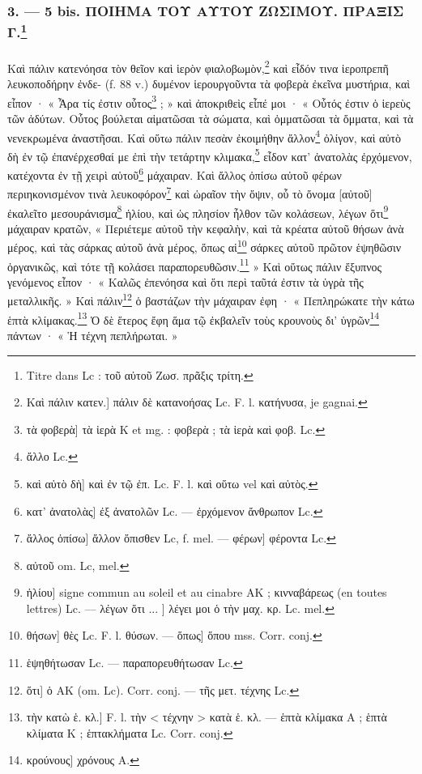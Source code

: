\documentclass[landscape, a4paper, 11pt, oneside, polutonikogreek, french]{article}
\begin{document}
\subsubsection[3. --- 5 bis. ΠΟΙΗΜΑ ΤΟΥ ΑΥΤΟΥ ΖΩΣΙΜΟΥ. ΠΡΑΞΙΣ Γ.]{3. --- 5 bis. ΠΟΙΗΜΑ ΤΟΥ ΑΥΤΟΥ ΖΩΣΙΜΟΥ. ΠΡΑΞΙΣ Γ.\footnote{Titre dans Lc : τοῦ αὐτοῦ Ζωσ. πρᾶξις τρίτη.}}
\paragraph{}
Καὶ πάλιν κατενόησα τὸν θεῖον καὶ ἱερὸν φιαλοβωμὸν,\footnote{Καὶ πάλιν κατεν.] πάλιν δὲ κατανοήσας Lc. F. l. κατήνυσα, je gagnai.} καὶ εἶδόν τινα ἱεροπρεπῆ λευκοποδήρην ἐνδε- (f. 88 v.) δυμένον ἱερουργοῦντα τὰ φοβερὰ ἐκεῖνα μυστήρια, καὶ εἶπον · « Ἆρα τίς ἐστιν οὗτος\footnote{τὰ φοβερὰ] τὰ ἱερὰ K et mg. : φοβερὰ ; τὰ ἱερὰ καὶ φοβ. Lc.} ; » καὶ ἀποκριθεὶς εἶπέ μοι · « Οὗτός ἐστιν ὁ ἱερεὺς τῶν ἀδύτων. Οὗτος βούλεται αἱματῶσαι τὰ σώματα, καὶ ὀμματῶσαι τὰ ὄμματα, καὶ τὰ νενεκρωμένα ἀναστῆσαι. Καὶ οὕτω πάλιν πεσὰν ἐκοιμήθην ἄλλον\footnote{ἄλλο Lc.} ὀλίγον, καὶ αὐτὸ δὴ ἐν τῷ ἐπανέρχεσθαί με ἐπὶ τὴν τετάρτην κλιμακα,\footnote{καὶ αὐτὸ δὴ] καὶ ἐν τῷ ἐπ. Lc. F. l. καὶ οὕτω vel καὶ αὐτὸς.} εἶδον κατ' ἀνατολὰς ἐρχόμενον, κατέχοντα ἐν τῇ χειρὶ αὑτοῦ\footnote{κατ' ἀνατολὰς] ἐξ ἀνατολῶν Lc. --- ἐρχόμενον ἄνθρωπον Lc.} μάχαιραν. Καὶ ἄλλος ὀπίσω αὐτοῦ φέρων περιηκονισμένον τινὰ λευκοφόρον\footnote{ἄλλος ὀπίσω] ἄλλον ὄπισθεν Lc, f. mel. --- φέρων] φέροντα Lc.} καὶ ὡραῖον τὴν ὄψιν, οὗ τὸ ὄνομα [αὐτοῦ] ἐκαλεῖτο μεσουράνισμα\footnote{αὐτοῦ om. Lc, mel.} ἡλίου, καὶ ὡς πλησίον ἦλθον τῶν κολάσεων, λέγων ὅτι\footnote{ἡλίου] signe commun au soleil et au cinabre AK ; κινναβάρεως (en toutes lettres) Lc. --- λέγων ὅτι ... ] λέγει μοι ὁ τὴν μαχ. κρ. Lc. mel.} μάχαιραν κρατῶν, « Περιέτεμε αὐτοῦ τὴν κεφαλὴν, καὶ τὰ κρέατα αὐτοῦ θήσων ἀνὰ μέρος, καὶ τὰς σάρκας αὐτοῦ ἀνὰ μέρος, ὅπως αἱ\footnote{θήσων] θὲς Lc. F. l. θύσων. --- ὅπως] ὅπου mss. Corr. conj.} σάρκες αὐτοῦ πρῶτον ἑψηθῶσιν ὀργανικῶς, καὶ τότε τῇ κολάσει παραπορευθῶσιν.\footnote{ἑψηθήτωσαν Lc. --- παραπορευθήτωσαν Lc.} » Καὶ οὕτως πάλιν ἔξυπνος γενόμενος εἶπον · « Καλῶς ἐπενόησα καὶ ὅτι περὶ ταῦτά ἐστιν τὰ ὑγρὰ τῆς μεταλλικῆς. » Καὶ πάλιν\footnote{ὅτι] ὁ AK (om. Lc). Corr. conj. --- τῆς μετ. τέχνης Lc.} ὁ βαστάζων τὴν μάχαιραν ἐφη · « Πεπληρώκατε τὴν κάτω ἑπτὰ κλίμακας.\footnote{τὴν κατὼ ἑ. κλ.] F. l. τὴν < τέχνην > κατὰ ἑ. κλ. --- ἑπτὰ κλίμακα A ; ἑπτὰ κλίματα K ; ἑπτακλήματα Lc. Corr. conj.} Ὁ δὲ ἕτερος ἔφη ἅμα τῷ ἐκβαλεῖν τοὺς κρουνοὺς δι' ὑγρῶν\footnote{κρούνους] χρόνους A.} πάντων · « Ἡ τέχνη πεπλήρωται. »
\end{document}
